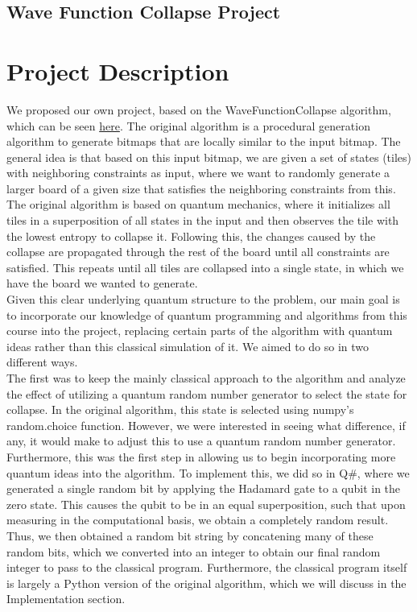 \documentclass[10pt]{article}
\begin{document}
\begin{center}
\section*{Wave Function Collapse Project}
\end{center}

\section{Project Description}
We proposed our own project, based on the WaveFunctionCollapse algorithm, which can be seen \href{https://github.com/mxgmn/WaveFunctionCollapse}{here}. The original algorithm is a procedural generation algorithm to generate bitmaps that are locally similar to the input bitmap. The general idea is that based on this input bitmap, we are given a set of states (tiles) with neighboring constraints as input, where we want to randomly generate a larger board of a given size that satisfies the neighboring constraints from this. The original algorithm is based on quantum mechanics, where it initializes all tiles in a superposition of all states in the input and then observes the tile with the lowest entropy to collapse it. Following this, the changes caused by the collapse are propagated through the rest of the board until all constraints are satisfied. This repeats until all tiles are collapsed into a single state, in which we have the board we wanted to generate.\\
\indent Given this clear underlying quantum structure to the problem, our main goal is to incorporate our knowledge of quantum programming and algorithms from this course into the project, replacing certain parts of the algorithm with quantum ideas rather than this classical simulation of it. We aimed to do so in two different ways.\\
\indent The first was to keep the mainly classical approach to the algorithm and analyze the effect of utilizing a quantum random number generator to select the state for collapse. In the original algorithm, this state is selected using numpy's random.choice function. However, we were interested in seeing what difference, if any, it would make to adjust this to use a quantum random number generator. Furthermore, this was the first step in allowing us to begin incorporating more quantum ideas into the algorithm. To implement this, we did so in Q$\#$, where we generated a single random bit by applying the Hadamard gate to a qubit in the zero state. This causes the qubit to be in an equal superposition, such that upon measuring in the computational basis, we obtain a completely random result. Thus, we then obtained a random bit string by concatening many of these random bits, which we converted into an integer to obtain our final random integer to pass to the classical program. Furthermore, the classical program itself is largely a Python version of the original algorithm, which we will discuss in the Implementation section.\\
\end{document}
